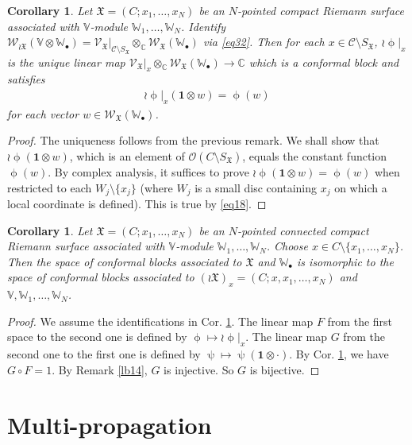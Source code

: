 \documentclass[12pt,a4paper,notitlepage]{article}
\theoremstyle{definition}
\theoremstyle{plain}
\newtheorem{co}[df]{Corollary}
\newcommand{\fk}{\mathfrak}
\newcommand{\mc}{\mathcal}
\newcommand{\id}{\mathbf{1}}
\newcommand{\scr}{\mathscr}
\newcommand{\SX}{{S_{\fk X}}}
\newcommand{\blt}{\bullet}
\newcommand{\Vbb}{\mathbb V}
\newcommand{\Wbb}{\mathbb W}
\newcommand{\Cbb}{\mathbb C}
\numberwithin{equation}{section}
\begin{document}
\begin{co}\label{lb13}
Let $\fk X=(C;x_1,\dots,x_N)$ be an $N$-pointed compact Riemann surface associated with $\Vbb$-module $\Wbb_1,\dots,\Wbb_N$. Identify $\scr W_{\wr\fk X}(\Vbb\otimes\Wbb_\blt)=\scr V_{\fk X}\big|_{\mc C\setminus\SX}\otimes_\Cbb\scr W_{\fk X}(\Wbb_\blt)$ via \eqref{eq32}. Then for each $x\in\mc C\setminus\SX$, $\wr\upphi|_x$ is the unique linear map $\scr V_{\fk X}\big|_x\otimes_\Cbb\scr W_{\fk X}(\Wbb_\blt)\rightarrow\Cbb$ which is a conformal block and satisfies
\begin{align*}
\wr\upphi|_x(\id\otimes w)=\upphi(w)	
\end{align*}
for each vector $w\in\scr W_{\fk X}(\Wbb_\blt)$.
\end{co}

\begin{proof}
The uniqueness follows from the previous remark. We shall show that $\wr\upphi(\id\otimes w)$, which is an element of $\scr O(C\setminus\SX)$, equals the constant function $\upphi(w)$. By complex analysis, it suffices to prove $\wr\upphi(\id\otimes w)=\upphi(w)$ when restricted to each $W_j\setminus\{x_j\}$ (where $W_j$ is a small disc containing $x_j$ on which a local coordinate is defined). This is true by \eqref{eq18}.
\end{proof}

\begin{co}\label{lb25}
Let $\fk X=(C;x_1,\dots,x_N)$ be an $N$-pointed connected compact Riemann surface associated with $\Vbb$-module $\Wbb_1,\dots,\Wbb_N$. Choose $x\in C\setminus\{x_1,\dots,x_N\}$. Then the space of conformal blocks associated to $\fk X$ and $\Wbb_\blt$ is isomorphic to the space of conformal blocks associated to $(\wr\fk X)_x=(C;x,x_1,\dots,x_N)$ and $\Vbb,\Wbb_1,\dots,\Wbb_N$.
\end{co}

\begin{proof}
We assume the identifications in Cor. \ref{lb13}. The linear map $F$ from the first space to the second one is defined by $\upphi\mapsto\wr\upphi|_x$. The linear map $G$ from the second one to the first one is defined by $\uppsi\mapsto\uppsi(\id\otimes\cdot)$. By Cor. \ref{lb13}, we have $G\circ F=1$. By Remark \ref{lb14}, $G$ is injective. So $G$ is bijective.
\end{proof}





\section{Multi-propagation}\label{lb20}
\end{document}
